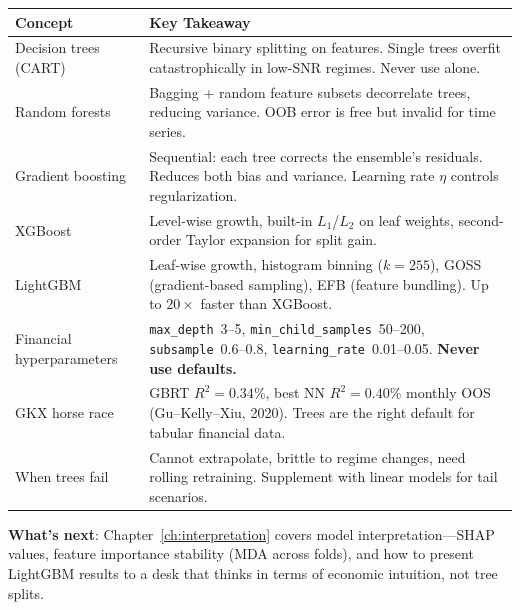 \begin{center}
\begin{tabular}{p{4cm} p{9.5cm}}
\toprule
\textbf{Concept} & \textbf{Key Takeaway} \\
\midrule
Decision trees (CART) & Recursive binary splitting on features. Single trees overfit catastrophically in low-SNR regimes. Never use alone. \\[6pt]
Random forests & Bagging + random feature subsets decorrelate trees, reducing variance. OOB error is free but invalid for time series. \\[6pt]
Gradient boosting & Sequential: each tree corrects the ensemble's residuals. Reduces both bias and variance. Learning rate $\eta$ controls regularization. \\[6pt]
XGBoost & Level-wise growth, built-in $L_1$/$L_2$ on leaf weights, second-order Taylor expansion for split gain. \\[6pt]
LightGBM & Leaf-wise growth, histogram binning ($k{=}255$), GOSS (gradient-based sampling), EFB (feature bundling). Up to $20\times$ faster than XGBoost. \\[6pt]
Financial hyperparameters & \texttt{max\_depth}~3--5, \texttt{min\_child\_samples}~50--200, \texttt{subsample}~0.6--0.8, \texttt{learning\_rate}~0.01--0.05. \textbf{Never use defaults.} \\[6pt]
GKX horse race & GBRT $R^2 = 0.34\%$, best NN $R^2 = 0.40\%$ monthly OOS (Gu--Kelly--Xiu, 2020). Trees are the right default for tabular financial data. \\[6pt]
When trees fail & Cannot extrapolate, brittle to regime changes, need rolling retraining. Supplement with linear models for tail scenarios. \\
\bottomrule
\end{tabular}
\end{center}

\bigskip
\noindent\textbf{What's next}: Chapter~\ref{ch:interpretation} covers model interpretation---SHAP values, feature importance stability (MDA across folds), and how to present LightGBM results to a desk that thinks in terms of economic intuition, not tree splits.
